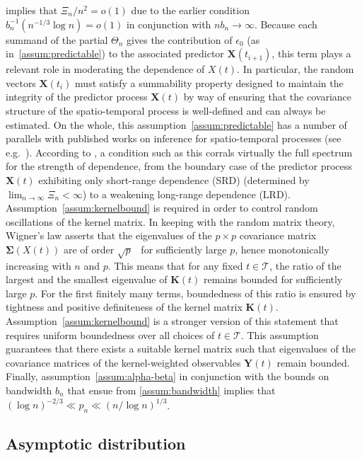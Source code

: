\documentclass[aos]{imsart}
\theoremstyle{plain}
\theoremstyle{remark}
\newcommand{\Tcal}{\mathcal{T}}
\newcommand{\bb}[1]{\boldsymbol{#1}}
\begin{document}
implies that  $\Xi_n/n^{2} = o(1)$ due to the earlier condition $b_n^{-1} (n^{-1/3} \log n) = o(1)$ in conjunction with $nb_n \rightarrow \infty$. Because each summand of the partial $\Theta_n$ gives the contribution of $\epsilon_0$ (as in~\ref{assum:predictable}) to the associated predictor $\bb{X}(t_{i+1})$, this term plays a relevant role in moderating the dependence of $X(t)$. In particular, the random vectors $\bb{X}(t_{i})$ must satisfy a summability property designed to maintain the integrity of the predictor process $\bb{X}(t)$ by way of ensuring that the covariance structure of the spatio-temporal process is well-defined and can always be estimated. On the whole, this assumption~\ref{assum:predictable} has a number of parallels with published works on inference for spatio-temporal processes (see e.g.~\cite{zhao2008confidence,zhou2009local,deb2021nonparametric}). According to \cite{zhao2008confidence}, a condition such as this  corrals virtually  the full spectrum for the strength of dependence, from the boundary case of the predictor process $\bb{X}(t)$ exhibiting  only short-range dependence (SRD) (determined by $\lim_{n \rightarrow \infty} \Xi_n < \infty$) to a weakening long-range dependence (LRD). Assumption~\ref{assum:kernelbound} is required in order to control random oscillations of the kernel matrix. In keeping with the random matrix theory, Wigner's law asserts that the eigenvalues of the $p \times p$ covariance matrix $\bb{\Sigma}(X(t))$ are of order $\sqrt{p}$~\citep{vershynin2010introduction} for sufficiently large $p$, hence monotonically increasing with $n$ and $p$. This means that for any fixed $t \in \Tcal$, the ratio of the largest and the smallest eigenvalue of $\bb{K}(t)$ remains bounded for sufficiently large $p$. For the first finitely many terms, boundedness of this ratio is ensured by tightness and positive definiteness of the kernel matrix $\bb{K}(t)$. Assumption~\ref{assum:kernelbound} is a stronger version of this statement that requires uniform boundedness over all choices of $t \in \Tcal$. This assumption guarantees that there exists a suitable kernel matrix such that eigenvalues of the covariance matrices of the kernel-weighted observables $\bb{Y}(t)$ remain bounded. Finally, assumption~\ref{assum:alpha-beta} in conjunction with the bounds on bandwidth $b_n$ that ensue from \ref{assum:bandwidth} implies that $ 
   (\log n)^{-2/3} \ll  p_n \ll  \left( n/\log n\right)^{1/3}$.



\subsection{Asymptotic distribution}
\end{document}
